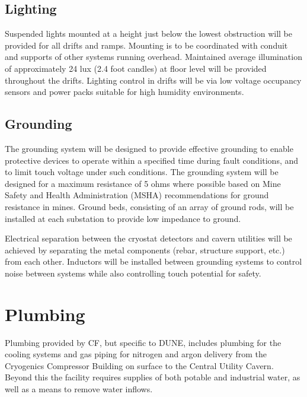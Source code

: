 \subsection{Lighting}
\label{sec:fscf-und-light}

Suspended lights mounted at a height just below the lowest obstruction will be provided for all drifts and ramps. Mounting is to be coordinated with conduit and supports of other systems running overhead. Maintained average illumination of approximately 24 lux (2.4 foot candles) at floor level will be provided throughout the drifts. Lighting control in drifts will be via low voltage occupancy sensors and power packs suitable for high humidity environments.

\subsection{Grounding}
\label{sec:fscf-und-grounding}

The grounding system will be designed to provide effective grounding to enable protective devices to operate within a specified time during fault conditions, and to limit touch voltage under such conditions. The grounding system will be designed for a maximum resistance of 5 ohms where possible based on Mine Safety and Health Administration (MSHA) recommendations for ground resistance in mines. Ground beds, consisting of an array of ground rods, will be installed at each substation to provide low impedance to ground.

Electrical separation between the cryostat detectors and cavern utilities will be achieved by separating the metal components (rebar, structure support, etc.) from each other. Inductors will be installed between grounding systems to control noise between systems while also controlling touch potential for safety.

\section{Plumbing}
\label{sec:fscf-und-plumbing}

Plumbing provided by CF, but specific to DUNE, includes plumbing for the cooling systems and gas piping for nitrogen and argon delivery from the Cryogenics Compressor Building on surface to the Central Utility Cavern. Beyond this the facility requires supplies of both potable and industrial water, as well as a means to remove water inflows. 

